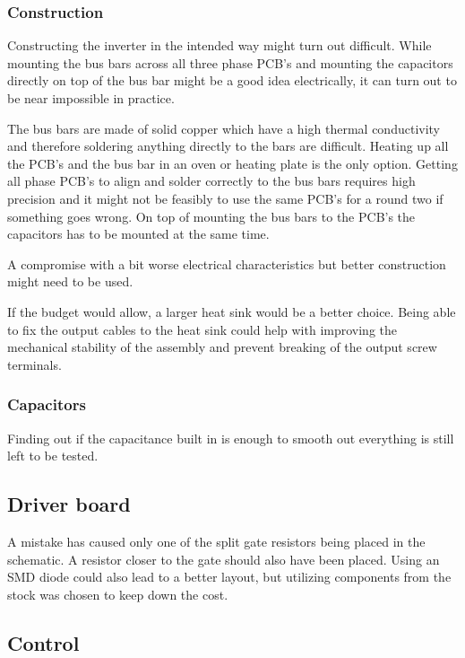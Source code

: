 \subsubsection{Construction}
Constructing the inverter in the intended way might turn out difficult. While mounting the bus bars across all three phase PCB's and mounting the capacitors directly on top of the bus bar might be a good idea electrically, it can turn out to be near impossible in practice.

The bus bars are made of solid copper which have a high thermal conductivity and therefore soldering anything directly to the bars are difficult. Heating up all the PCB's and the bus bar in an oven or heating plate is the only option. 
Getting all phase PCB's to align and solder correctly to the bus bars requires high precision and it might not be feasibly to use the same PCB's for a round two if something goes wrong.
On top of mounting the bus bars to the PCB's the capacitors has to be mounted at the same time. 

A compromise with a bit worse electrical characteristics but better construction might need to be used.

If the budget would allow, a larger heat sink would be a better choice. Being able to fix the output cables to the heat sink could help with improving the mechanical stability of the assembly and prevent breaking of the output screw terminals.

\subsubsection{Capacitors}
Finding out if the capacitance built in is enough to smooth out everything is still left to be tested.

\subsection{Driver board}
A mistake has caused only one of the split gate resistors being placed in the schematic. A resistor closer to the gate should also have been placed. Using an SMD diode could also lead to a better layout, but utilizing components from the stock was chosen to keep down the cost.

\subsection{Control}

